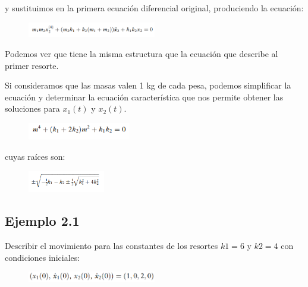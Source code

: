 \documentclass[a4paper]{article}
\begin{document}
y sustituimos en la primera ecuación diferencial original, produciendo la ecuación:


\begin{figure}[ht!]
\centering
\includegraphics[width=0.5\textwidth]{Ecuacion2_5.PNG}
\end{figure}

Podemos ver que tiene la misma estructura que la ecuación que describe al primer resorte. 

Si consideramos que las masas valen 1 kg de cada pesa, podemos simplificar la ecuación y determinar la ecuación característica que nos permite obtener las soluciones para $x_1(t)$ y $x_2(t)$.

\begin{figure}[ht!]
\centering
\includegraphics[width=0.4\textwidth]{ecuacion_caracteristica.PNG}
\end{figure}

cuyas raíces son:

\begin{figure}[ht!]
\centering
\includegraphics[width=0.3\textwidth]{roots.PNG}
\end{figure}

\subsection{Ejemplo 2.1}
Describir el movimiento para las constantes de los resortes $k1=6$ y $k2=4$ con condiciones iniciales:

\begin{figure}[ht!]
\centering
\includegraphics[width=0.5\textwidth]{Ejemplo2_1.PNG}
\end{figure}
\end{document}
